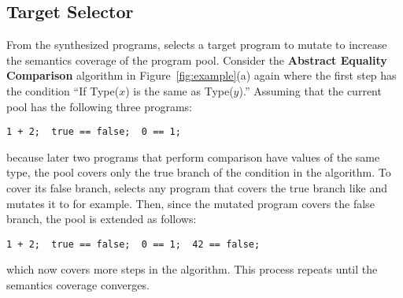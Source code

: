\subsection{Target Selector}
From the synthesized programs,  selects a
target program to mutate to increase the semantics coverage of the
program pool.  Consider the \textbf{Abstract Equality Comparison} algorithm 
in Figure~\ref{fig:example}(a) again where the first step has the condition
``If Type($x$) is the same as Type($y$).'' Assuming that the current pool
has the following three programs:
\begin{lstlisting}[style=myJSstyle]
           1 + 2;  true == false;  0 == 1;
\end{lstlisting}
because later two programs that perform comparison have values of the same type,
the pool covers only the true branch of the condition in the algorithm.
To cover its false branch,  selects any program
that covers the true branch like  and 
mutates it to  for example.  Then, since the mutated
program covers the false branch, the pool is extended as follows:
\begin{lstlisting}[style=myJSstyle]
   1 + 2;  true == false;  0 == 1;  42 == false;
\end{lstlisting}
which now covers more steps in the algorithm.
This process repeats until the semantics coverage converges.
